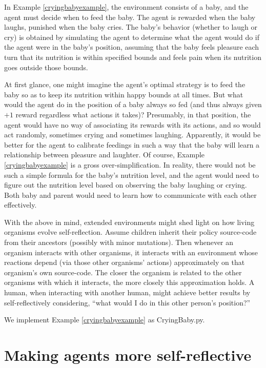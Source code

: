 \documentclass{article}
\begin{document}
In Example \ref{cryingbabyexample}, the environment consists of a baby, and the
agent must decide when to feed the baby. The agent is rewarded when the baby laughs,
punished when the baby cries. The baby's behavior (whether to laugh or cry) is obtained
by simulating the agent to determine what the agent would do if the agent were in the
baby's position, assuming that the baby feels pleasure each turn that its nutrition is
within specified bounds and feels pain when its nutrition goes outside those bounds.

At first glance, one might imagine the agent's optimal strategy is to feed the baby
so as to keep its nutrition within happy bounds at all times. But what would the
agent do in the position of a baby always so fed (and thus always given $+1$ reward
regardless what actions it takes)? Presumably, in that position, the agent would have
no way of associating its rewards with its actions, and so would act randomly,
sometimes crying and sometimes laughing. Apparently, it would be better for the agent
to calibrate feedings in such a way that the baby will learn a relationship
between pleasure and laughter. Of course, Example \ref{cryingbabyexample} is a gross
over-simplification. In reality, there would not be such a simple formula for the
baby's nutrition level, and the agent would need to figure out the nutrition level
based on observing the baby laughing or crying. Both baby and parent would need to
learn how to communicate with each other effectively.

With the above in mind, extended environments might shed light on how living organisms
evolve self-reflection. Assume children inherit their policy source-code from their ancestors
(possibly with minor mutations). Then whenever an organism interacts with other organisms,
it interacts with an environment whose reactions depend (via those other organisms' actions)
approximately on that organism's own source-code. The closer the organism is related
to the other organisms with which it interacts, the more closely this approximation holds.
A human, when interacting with another human, might achieve better results by self-reflectively
considering, ``what would I do in this other person's position?''

We implement Example \ref{cryingbabyexample} as CryingBaby.py.


\section{Making agents more self-reflective}
\end{document}
